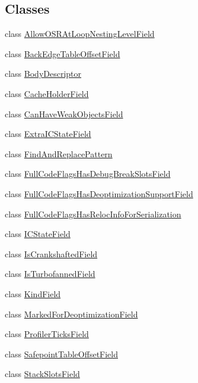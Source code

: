 \subsection*{Classes}
\begin{DoxyCompactItemize}
\item 
class \hyperlink{classv8_1_1internal_1_1_code_1_1_allow_o_s_r_at_loop_nesting_level_field}{Allow\+O\+S\+R\+At\+Loop\+Nesting\+Level\+Field}
\item 
class \hyperlink{classv8_1_1internal_1_1_code_1_1_back_edge_table_offset_field}{Back\+Edge\+Table\+Offset\+Field}
\item 
class \hyperlink{classv8_1_1internal_1_1_code_1_1_body_descriptor}{Body\+Descriptor}
\item 
class \hyperlink{classv8_1_1internal_1_1_code_1_1_cache_holder_field}{Cache\+Holder\+Field}
\item 
class \hyperlink{classv8_1_1internal_1_1_code_1_1_can_have_weak_objects_field}{Can\+Have\+Weak\+Objects\+Field}
\item 
class \hyperlink{classv8_1_1internal_1_1_code_1_1_extra_i_c_state_field}{Extra\+I\+C\+State\+Field}
\item 
class \hyperlink{classv8_1_1internal_1_1_code_1_1_find_and_replace_pattern}{Find\+And\+Replace\+Pattern}
\item 
class \hyperlink{classv8_1_1internal_1_1_code_1_1_full_code_flags_has_debug_break_slots_field}{Full\+Code\+Flags\+Has\+Debug\+Break\+Slots\+Field}
\item 
class \hyperlink{classv8_1_1internal_1_1_code_1_1_full_code_flags_has_deoptimization_support_field}{Full\+Code\+Flags\+Has\+Deoptimization\+Support\+Field}
\item 
class \hyperlink{classv8_1_1internal_1_1_code_1_1_full_code_flags_has_reloc_info_for_serialization}{Full\+Code\+Flags\+Has\+Reloc\+Info\+For\+Serialization}
\item 
class \hyperlink{classv8_1_1internal_1_1_code_1_1_i_c_state_field}{I\+C\+State\+Field}
\item 
class \hyperlink{classv8_1_1internal_1_1_code_1_1_is_crankshafted_field}{Is\+Crankshafted\+Field}
\item 
class \hyperlink{classv8_1_1internal_1_1_code_1_1_is_turbofanned_field}{Is\+Turbofanned\+Field}
\item 
class \hyperlink{classv8_1_1internal_1_1_code_1_1_kind_field}{Kind\+Field}
\item 
class \hyperlink{classv8_1_1internal_1_1_code_1_1_marked_for_deoptimization_field}{Marked\+For\+Deoptimization\+Field}
\item 
class \hyperlink{classv8_1_1internal_1_1_code_1_1_profiler_ticks_field}{Profiler\+Ticks\+Field}
\item 
class \hyperlink{classv8_1_1internal_1_1_code_1_1_safepoint_table_offset_field}{Safepoint\+Table\+Offset\+Field}
\item 
class \hyperlink{classv8_1_1internal_1_1_code_1_1_stack_slots_field}{Stack\+Slots\+Field}
\end{DoxyCompactItemize}
